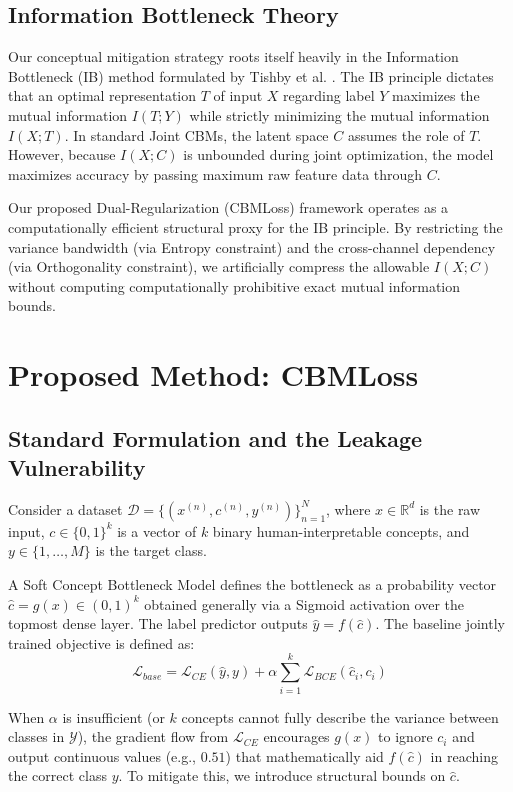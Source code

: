 \documentclass[times,twocolumn,final]{elsarticle}
\begin{document}
\subsection{Information Bottleneck Theory}
Our conceptual mitigation strategy roots itself heavily in the Information Bottleneck (IB) method formulated by Tishby et al. \citep{tishby2000information}. The IB principle dictates that an optimal representation $T$ of input $X$ regarding label $Y$ maximizes the mutual information $I(T; Y)$ while strictly minimizing the mutual information $I(X; T)$. In standard Joint CBMs, the latent space $C$ assumes the role of $T$. However, because $I(X; C)$ is unbounded during joint optimization, the model maximizes accuracy by passing maximum raw feature data through $C$. 

Our proposed Dual-Regularization (CBMLoss) framework operates as a computationally efficient structural proxy for the IB principle. By restricting the variance bandwidth (via Entropy constraint) and the cross-channel dependency (via Orthogonality constraint), we artificially compress the allowable $I(X; C)$ without computing computationally prohibitive exact mutual information bounds.

\section{Proposed Method: CBMLoss}
\label{sec:method}

\subsection{Standard Formulation and the Leakage Vulnerability}
Consider a dataset $\mathcal{D} = \{(x^{(n)}, c^{(n)}, y^{(n)})\}_{n=1}^N$, where $x \in \mathbb{R}^d$ is the raw input, $c \in \{0, 1\}^k$ is a vector of $k$ binary human-interpretable concepts, and $y \in \{1, \dots, M\}$ is the target class.

A Soft Concept Bottleneck Model defines the bottleneck as a probability vector $\hat{c} = g(x) \in (0,1)^k$ obtained generally via a Sigmoid activation over the topmost dense layer. The label predictor outputs $\hat{y} = f(\hat{c})$. The baseline jointly trained objective is defined as:
\begin{equation}
    \mathcal{L}_{base} = \mathcal{L}_{CE}(\hat{y}, y) + \alpha \sum_{i=1}^k \mathcal{L}_{BCE}(\hat{c}_i, c_i)
\end{equation}

When $\alpha$ is insufficient (or $k$ concepts cannot fully describe the variance between classes in $\mathcal{Y}$), the gradient flow from $\mathcal{L}_{CE}$ encourages $g(x)$ to ignore $c_i$ and output continuous values (e.g., $0.51$) that mathematically aid $f(\hat{c})$ in reaching the correct class $y$. To mitigate this, we introduce structural bounds on $\hat{c}$.
\end{document}
